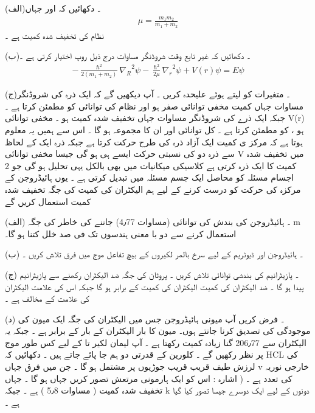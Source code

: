 (الف)۔  دکھائیں    کہ    اور 
جہاں 
\begin{align}
\mu = \frac{ m_1 m_2 }{ m_1 + m_2 }
\end{align}
نظام کی تخفیف شدہ کمیت ہے ۔
 
(ب)۔ دکھائیں کہ غیر تابع وقت شروڈنگر  مساوات درج ذیل روپ اختیار کرتی ہے ۔
\begin{align}
- \frac{ \hslash^2 }{ 2 ( m_1 + m_2 ) } { \nabla_R }^2  \psi - \frac{ \hslash^2 }{ 2 \mu } { \nabla_r }^2 { \psi } + V(r) \psi = E \psi
\end{align}


(ج)۔ متغیرات کو   لیتے ہوئے علیحدہ کریں ۔ آپ دیکھیں گے کہ    ایک ذرہ کی شروڈنگر مساوات جہاں کمیت   مخفی توانائی صفر ہو اور نظام کی توانائی   کو مطمئن کرتا ہے ۔ جبکہ   ایک ذرے کی شروڈنگر مساوات جہاں تخفیف شدہ کمیت ہو ۔  مخفی توانائی  V(r) ہو ، کو مطمئن کرتا ہے ۔ کل توانائی اور ان کا مجموعہ   ہو گا ۔ اس سے ہمیں یہ معلوم ہوتا ہے  کہ مرکز ی کمیت ایک آزاد ذرہ کی طرح حرکت کرتا ہے جبکہ ذرہ ایک کے لحاظ سے ذرہ دو کی  نسبتی حرکت ایسے ہی ہو گی جیسا مخفی توانائی V میں تخفیف شدہ کمیت کا ایک ذرہ  کرتی ہے کلاسیکی میکانیات میں بھی بالکل یہی تحلیل ہو گی    جو 2 اجسام مسئلہ کو محاصل ایک جسم مسئلہ میں  تبدیل کرتی ہے ۔ 
 یوں ہائیڈروجن کے مرکزہ کی حرکت کو درست کرنے کے لیے ہم الیکٹران  کی کمیت کی جگہ تخفیف شدہ کمیت استعمال کریں گے 

(الف) ۔ ہائیڈروجن کی بندش کی توانائی (مساوات 4٫77) جاننے کی خاطر   کی جگہ m استعمال کرنے سے  دو با معنی ہندسوں تک فی صد خلل کتنا ہو گا۔  

(ب) ۔ ہائیڈروجن اور ڈیوٹریم کے لیے     سرخ بالمر لکیروں کے بیچ تفاعل موج میں فرق تلاش کریں ۔ 

(ج) ۔ پازیٹرانیم کی بندشی توانائی تلاش کریں ۔ پروٹان کی جگہ  ضد الیکٹران رکھنے سے پازیٹرانیم پیدا ہو گا ۔ ضد الیکٹران کی کمیت الیکٹران کی کمیت کے برابر ہو گا جبکہ اس کی علامت الیکٹران کی علامت کے مخالف ہے ۔ 

(د) ۔ فرض کریں آپ میونی ہائیڈروجن  جس میں الیکٹران کی جگہ ایک میون کی موجودگی کی تصدیق کرنا جانتے ہوں۔ میون کا بار  الیکٹران کے بار  کے برابر ہے ۔ جبکہ یہ الیکٹران سے 206٫77 گنا زیادہ  کمیت رکھتا ہے ۔  آپ لیمان    لکیر    تا   کے لیے کس طور موج پر نظر رکھیں گے ۔ 
کلورین کے قدرتی دو ہم جا    پائے جاتے ہیں ۔ دکھائیں کہ HCL کی  لرزش   طیف قریب قریب   جوڑیوں پر مشتمل ہو گا ۔ جن میں فرق   جہاں v خارجی نوریہ کی تعدد ہے ۔  ( اشارہ : اس کو ایک ہارمونی مرتعش تصور کریں جہاں   ہو گا ۔ جہاں   تخفیف شدہ کمیت ( مساوات 5٫8 ) ہے ۔ جبکہ k دونوں کے لیے ایک دوسرے  جیسا تصور کیا گیا  ہے ۔ 

